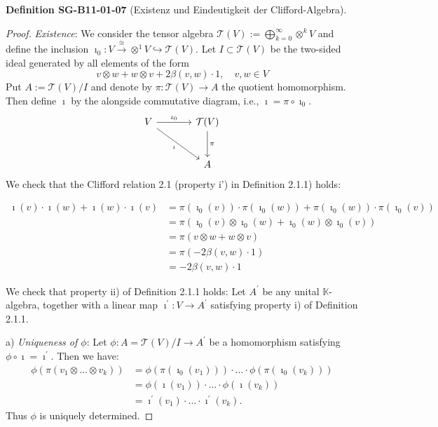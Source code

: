 \documentclass[10pt, letterpaper]{article}
\newcommand{\CustomHeading}[3]{%
  \par\medskip\noindent%
  \textbf{#1 #2} \textnormal{(#3)}.\enskip%
}
\newenvironment{DEF}[2]{\begin{unitbox}\CustomHeading{Definition}{#1}{#2}}{\end{unitbox}}
\begin{document}
\begin{DEF}{SG-B11-01-07}{Existenz und Eindeutigkeit der Clifford-Algebra}
\begin{proof}
\emph{Existence}: We consider the tensor algebra $\mathcal{T}(V):=\bigoplus_{k=0}^{\infty} \otimes^{k} V$ and define the inclusion $\imath_{0}: V \xrightarrow{\cong} \otimes^{1} V \hookrightarrow \mathcal{T}(V)$. Let $I \subset \mathcal{T}(V)$ be the two-sided ideal generated by all elements of the form
$$
v \otimes w+w \otimes v+2 \beta(v, w) \cdot 1, \quad v, w \in V
$$
Put $A:=\mathcal{T}(V) / I$ and denote by $\pi: \mathcal{T}(V) \rightarrow A$ the quotient homomorphism. Then define $\imath$ by the alongside commutative diagram, i.e., $\imath=\pi \circ \imath_{0}$.
\[
\begin{tikzcd}[row sep=large, column sep=large]
V \arrow[r, "\iota_0"] \arrow[dr, "\iota"'] & \mathcal{T}(V) \arrow[d, "\pi"] \\
& A
\end{tikzcd}
\]
We check that the Clifford relation 2.1 (property i') in Definition 2.1.1) holds:

$$
\begin{aligned}
\imath(v) \cdot \imath(w)+\imath(w) \cdot \imath(v) & =\pi\left(\imath_{0}(v)\right) \cdot \pi\left(\imath_{0}(w)\right)+\pi\left(\imath_{0}(w)\right) \cdot \pi\left(\imath_{0}(v)\right) \\
& =\pi\left(\imath_{0}(v) \otimes \imath_{0}(w)+\imath_{0}(w) \otimes \imath_{0}(v)\right) \\
& =\pi(v \otimes w+w \otimes v) \\
& =\pi(-2 \beta(v, w) \cdot 1) \\
& =-2 \beta(v, w) \cdot 1
\end{aligned}
$$

We check that property ii) of Definition 2.1.1 holds: Let $A^{\prime}$ be any unital $\mathbb{K}$-algebra, together with a linear map $\imath^{\prime}: V \rightarrow A^{\prime}$ satisfying property i) of Definition 2.1.1.

a) \emph{Uniqueness of $\phi$}: Let $\phi: A=\mathcal{T}(V) / I \rightarrow A^{\prime}$ be a homomorphism satisfying $\phi \circ \imath=\imath^{\prime}$. Then we have:
$$
\begin{aligned}
\phi\left(\pi\left(v_{1} \otimes \ldots \otimes v_{k}\right)\right) & =\phi\left(\pi\left(\imath_{0}\left(v_{1}\right)\right)\right) \cdot \ldots \cdot \phi\left(\pi\left(\imath_{0}\left(v_{k}\right)\right)\right) \\
& =\phi\left(\imath\left(v_{1}\right)\right) \cdot \ldots \cdot \phi\left(\imath\left(v_{k}\right)\right) \\
& =\imath^{\prime}\left(v_{1}\right) \cdot \ldots \cdot \imath^{\prime}\left(v_{k}\right) .
\end{aligned}
$$
Thus $\phi$ is uniquely determined.



\end{proof}
\end{DEF}
\end{document}
